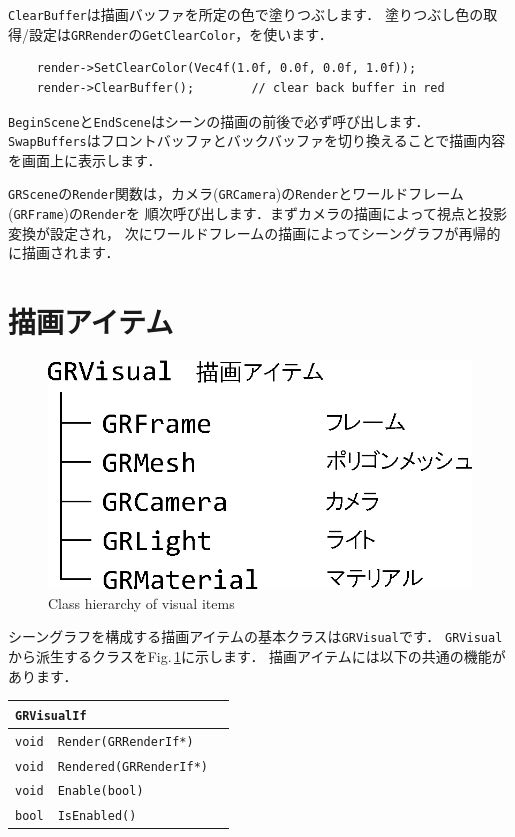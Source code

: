 \texttt{ClearBuffer}\KLUDGE は描画バッファを所定の色で塗りつぶします．
\KLUDGE 塗りつぶし色の取得/\KLUDGE 設定は\texttt{GRRender}\KLUDGE の\texttt{GetClearColor}\KLUDGE ，\KLUDGE を使います．
\begin{verbatim}
    render->SetClearColor(Vec4f(1.0f, 0.0f, 0.0f, 1.0f));
    render->ClearBuffer();        // clear back buffer in red
\end{verbatim}

\texttt{BeginScene}\KLUDGE と\texttt{EndScene}\KLUDGE はシーンの描画の前後で必ず呼び出します．
\texttt{SwapBuffers}\KLUDGE はフロントバッファとバックバッファを切り換えることで描画内容を画面上に表示します．

\texttt{GRScene}\KLUDGE の\texttt{Render}\KLUDGE 関数は，カメラ(\texttt{GRCamera})\KLUDGE の\texttt{Render}\KLUDGE とワールドフレーム(\texttt{GRFrame})\KLUDGE の\texttt{Render}\KLUDGE を
\KLUDGE 順次呼び出します．まずカメラの描画によって視点と投影変換が設定され，
\KLUDGE 次にワールドフレームの描画によってシーングラフが再帰的に描画されます．

\section{\KLUDGE 描画アイテム}

\begin{figure}[t]
\begin{center}
\includegraphics[width=.4\hsize]{fig/grvisual.eps}
\end{center}
\caption{Class hierarchy of visual items}
\label{fig_grvisual}
\end{figure}

\KLUDGE シーングラフを構成する描画アイテムの基本クラスは\texttt{GRVisual}\KLUDGE です．
\texttt{GRVisual}\KLUDGE から派生するクラスをFig.\,\ref{fig_grvisual}\KLUDGE に示します．
\KLUDGE 描画アイテムには以下の共通の機能があります．

\begin{center}
\begin{tabular}{p{.15\hsize}p{.45\hsize}p{.3\hsize}}
\multicolumn{3}{l}{\texttt{GRVisualIf}}					\\ \midrule
\texttt{void}	& \texttt{Render(GRRenderIf*)}		& 	\\
\texttt{void} 	& \texttt{Rendered(GRRenderIf*)}	& 	\\
\texttt{void} 	& \texttt{Enable(bool)}				& 	\\
\texttt{bool} 	& \texttt{IsEnabled()}				& 	\\
\end{tabular}
\end{center}

